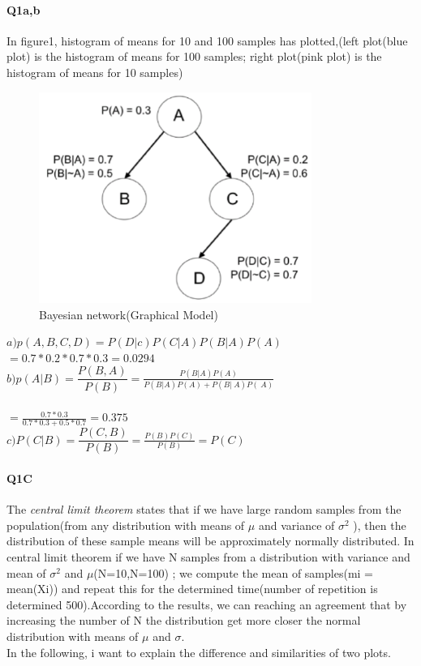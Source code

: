 \documentclass[12pt]{article}
\begin{document}
	\maketitle
	
	\paragraph{Q1a,b} In figure1, histogram of means for 10 and 100 samples has plotted,(left plot(blue plot) is the histogram of means for 100 samples; right plot(pink plot) is the histogram of means for 10 samples) 
	
	\begin{figure}[h]
		
		\centerline{\includegraphics[width=3.5in]{22.png}}
		\caption{ Bayesian network(Graphical Model) }
		\label{fig1:Histograms pw1=pw2}
		
	\end{figure}
	
	$a) p(A,B,C,D)=P(D|c)P(C|A)P(B|A)P(A) $ $=0.7*0.2*0.7*0.3=0.0294$\\
	
	$b) p(A|B)=\dfrac{P(B,A)}{P(B)}=\frac{P(B|A)P(A)}{P(B|A)P(A)+P(B|~A)P(~A)}$\\\\
	
	 $=\frac{0.7*0.3}{0.7*0.3+0.5*0.7}=0.375$\\
	 
	 
	 $c) P(C|B)=\dfrac{P(C,B)}{P(B)}=\frac{P(B)P(C)}{P(B)}=P(C)$\\
	\paragraph{Q1C}
	 The \textit{central limit theorem} states that if we have  large random samples from the population(from any distribution
	 with means of $\mu$ and variance of $\sigma^{2}$ ), then the distribution of these sample means will be approximately normally distributed. In central limit theorem if we have N samples from a  distribution with variance and mean of $\sigma^2$ and $\mu$(N=10,N=100) ; we compute the mean of samples(mi = mean(Xi)) and repeat this for the determined time(number of repetition is determined 500).According to the results, we can reaching an agreement that by increasing the number of N the distribution get more closer the normal distribution with means of $\mu$ and $\sigma$. \\ In the following, i want to explain the difference and similarities of two plots.\\\\
	
\end{document}
